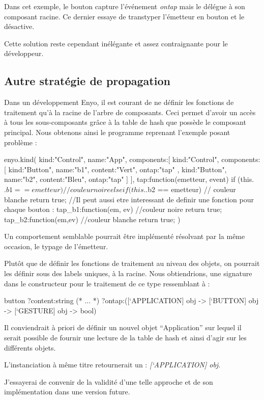 Dans cet exemple, le bouton capture l'événement \emph{ontap} mais le délégue
à son composant racine. Ce dernier essaye de transtyper l'émetteur en bouton
et le désactive.

Cette solution reste cependant inélégante et assez contraignante pour le développeur.

\subsection{Autre stratégie de propagation}\label{sub:event_amel}

Dans un développement Enyo, il est courant de ne définir les fonctions de traitement qu'à la racine de l'arbre
de composants. Ceci permet d'avoir un accès à tous les sous-composants grâce à la table de hash que possède
le composant principal. Nous obtenons ainsi le programme reprenant l'exemple posant problème :
\begin{JavaScript}
  enyo.kind({
    kind:"Control",
    name:"App",
    components:[
      {
        kind:"Control",
        components:[
          {kind:"Button", name:"b1", content:"Vert",
            ontap:"tap"
          },
          {kind:"Button", name:"b2", content:"Bleu",         
            ontap:"tap"
          }
        ]
      }
    ],
    tap:function(emetteur, event){
      if (this.$.b1 == emetteur){
        // couleur noire
      } else if (this.$.b2 == emetteur){
        // couleur blanche 
      }
      return true;
    }
    //Il peut aussi etre interessant de definir une fonction pour chaque bouton :
    tap_b1:function(em, ev){ 
      //couleur noire
      return true;
    }
    tap_b2:function(em,ev){
      //couleur blanche
      return true;
    }
})
\end{JavaScript}

Un comportement semblable pourrait être implémenté résolvant par la même occasion, le typage de l'émetteur.

Plutôt que de définir les fonctions de traitement au niveau des objets, on pourrait les définir
sous des labels uniques, à la racine. Nous obtiendrions, une signature dans le constructeur
pour le traitement de ce type ressemblant à :
\begin{OCaml}
  button ?content:string
         (* ... *)
         ?ontap:([`APPLICATION] obj -> 
                 [`BUTTON] obj -> 
                 [`GESTURE] obj -> bool)
\end{OCaml}

Il conviendrait à priori de définir un nouvel objet ``Application'' sur lequel il serait possible de
fournir une lecture de la table de hash et ainsi d'agir sur les différents objets.

L'instanciation à même titre retournerait un : \emph{[`APPLICATION] obj}.

J'essayerai de convenir de la validité d'une telle approche et de son implémentation dans une 
version future.
